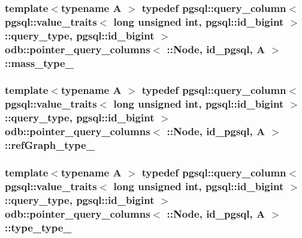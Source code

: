 \subsubsection[{mass\+\_\+type\+\_\+}]{\setlength{\rightskip}{0pt plus 5cm}template$<$typename A $>$ typedef pgsql\+::query\+\_\+column$<$ pgsql\+::value\+\_\+traits$<$ long unsigned int, pgsql\+::id\+\_\+bigint $>$\+::query\+\_\+type, pgsql\+::id\+\_\+bigint $>$ odb\+::pointer\+\_\+query\+\_\+columns$<$ \+::{\bf Node}, id\+\_\+pgsql, A $>$\+::{\bf mass\+\_\+type\+\_\+}}\label{structodb_1_1pointer__query__columns_3_01_1_1_node_00_01id__pgsql_00_01_a_01_4_ab8843582f1d0813730cd9a49ae43a195}
\hypertarget{structodb_1_1pointer__query__columns_3_01_1_1_node_00_01id__pgsql_00_01_a_01_4_a76e6e437dcf4f65a556b2087a1743c4c}{}
\subsubsection[{ref\+Graph\+\_\+type\+\_\+}]{\setlength{\rightskip}{0pt plus 5cm}template$<$typename A $>$ typedef pgsql\+::query\+\_\+column$<$ pgsql\+::value\+\_\+traits$<$ long unsigned int, pgsql\+::id\+\_\+bigint $>$\+::query\+\_\+type, pgsql\+::id\+\_\+bigint $>$ odb\+::pointer\+\_\+query\+\_\+columns$<$ \+::{\bf Node}, id\+\_\+pgsql, A $>$\+::{\bf ref\+Graph\+\_\+type\+\_\+}}\label{structodb_1_1pointer__query__columns_3_01_1_1_node_00_01id__pgsql_00_01_a_01_4_a76e6e437dcf4f65a556b2087a1743c4c}
\hypertarget{structodb_1_1pointer__query__columns_3_01_1_1_node_00_01id__pgsql_00_01_a_01_4_afc7b49347ca96fcd3a1328dcb4f9f214}{}
\subsubsection[{type\+\_\+type\+\_\+}]{\setlength{\rightskip}{0pt plus 5cm}template$<$typename A $>$ typedef pgsql\+::query\+\_\+column$<$ pgsql\+::value\+\_\+traits$<$ long unsigned int, pgsql\+::id\+\_\+bigint $>$\+::query\+\_\+type, pgsql\+::id\+\_\+bigint $>$ odb\+::pointer\+\_\+query\+\_\+columns$<$ \+::{\bf Node}, id\+\_\+pgsql, A $>$\+::{\bf type\+\_\+type\+\_\+}}\label{structodb_1_1pointer__query__columns_3_01_1_1_node_00_01id__pgsql_00_01_a_01_4_afc7b49347ca96fcd3a1328dcb4f9f214}


